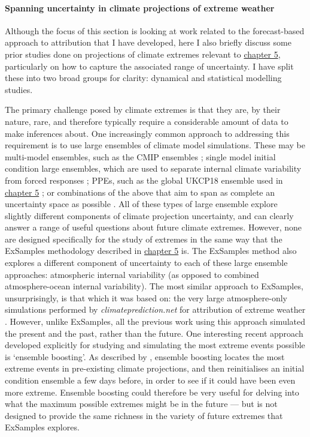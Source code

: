  \paragraph*{Spanning uncertainty in climate projections of extreme weather}

    Although the focus of this section is looking at work related to the forecast-based approach to attribution that I have developed, here I also briefly discuss some prior studies done on projections of climate extremes relevant to \hyperref[ch5]{chapter 5}, particularly on how to capture the associated range of uncertainty. I have split these into two broad groups for clarity: dynamical and statistical modelling studies.

    The primary challenge posed by climate extremes is that they are, by their nature, rare, and therefore typically require a considerable amount of data to make inferences about. One increasingly common approach to addressing this requirement is to use large ensembles of climate model simulations. These may be multi-model ensembles, such as the CMIP ensembles \citep{taylor_overview_2012,eyring_overview_2016}; single model initial condition large ensembles, which are used to separate internal climate variability from forced responses \citep{maher_large_2021}; PPEs, such as the global UKCP18 ensemble used in \hyperref[ch5]{chapter 5} \citep{lowe_ukcp18_2018}; or combinations of the above that aim to span as complete an uncertainty space as possible \citep{stainforth_uncertainty_2005,frame_climatepredictionnet_2009}. All of these types of large ensemble explore slightly different components of climate projection uncertainty, and can clearly answer a range of useful questions about future climate extremes. However, none are designed specifically for the study of extremes in the same way that the ExSamples methodology described in \hyperref[ch5]{chapter 5} is. The ExSamples method also explores a different component of uncertainty to each of these large ensemble approaches: atmospheric internal variability (as opposed to combined atmosphere-ocean internal variability). The most similar approach to ExSamples, unsurprisingly, is that which it was based on: the very large atmosphere-only simulations performed by \emph{climateprediction.net} for attribution of extreme weather \citep{pall_anthropogenic_2011,schaller_human_2016}. However, unlike ExSamples, all the previous work using this approach simulated the present and the past, rather than the future. One interesting recent approach developed explicitly for studying and simulating the most extreme events possible is `ensemble boosting'. As described by \citet{gessner_very_2021}, ensemble boosting locates the most extreme events in pre-existing climate projections, and then reinitialises an initial condition ensemble a few days before, in order to see if it could have been even more extreme. Ensemble boosting could therefore be very useful for delving into what the maximum possible extremes might be in the future --- but is not designed to provide the same richness in the variety of future extremes that ExSamples explores.


